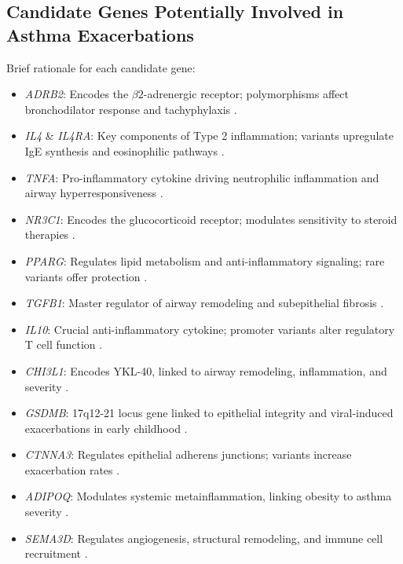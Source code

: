 \documentclass[11pt,a4paper]{article}
\begin{document}
\subsection{Candidate Genes Potentially Involved in Asthma Exacerbations}
Brief rationale for each candidate gene:
\begin{itemize}
    \item \textit{ADRB2}: Encodes the $\beta2$-adrenergic receptor; polymorphisms affect bronchodilator response and tachyphylaxis \cite{ZhaoZhang2019, KarimiVijverberg2021}.
    \item \textit{IL4} \& \textit{IL4RA}: Key components of Type 2 inflammation; variants upregulate IgE synthesis and eosinophilic pathways \cite{HameedAbood2024, ChoudharyLamichhane2024}.
    \item \textit{TNFA}: Pro-inflammatory cytokine driving neutrophilic inflammation and airway hyperresponsiveness \cite{AlAhmadAli2025, ZhuZhang2020}.
    \item \textit{NR3C1}: Encodes the glucocorticoid receptor; modulates sensitivity to steroid therapies \cite{PerezGarciaEspuelaOrtiz2023, PANEKJONAKOWSKI2016}.
    \item \textit{PPARG}: Regulates lipid metabolism and anti-inflammatory signaling; rare variants offer protection \cite{WangTantisira2016, LeungRyu2022}.
    \item \textit{TGFB1}: Master regulator of airway remodeling and subepithelial fibrosis \cite{PlichtaPanek2025, KowinJonakowski2024}.
    \item \textit{IL10}: Crucial anti-inflammatory cytokine; promoter variants alter regulatory T cell function \cite{WangTantisira2016, ImaniDashti2021}.
    \item \textit{CHI3L1}: Encodes YKL-40, linked to airway remodeling, inflammation, and severity \cite{ParkTantisira2017, KomiKazemi2016}.
    \item \textit{GSDMB}: 17q12-21 locus gene linked to epithelial integrity and viral-induced exacerbations in early childhood \cite{LiChristenson2021, SchoettlerDissanayake2022}.
    \item \textit{CTNNA3}: Regulates epithelial adherens junctions; variants increase exacerbation rates \cite{McGeachieWu2015}.
    \item \textit{ADIPOQ}: Modulates systemic metainflammation, linking obesity to asthma severity \cite{PetersDixon2018, GajewskaKuryowicz2016}.
    \item \textit{SEMA3D}: Regulates angiogenesis, structural remodeling, and immune cell recruitment \cite{McGeachieWu2015, RanjbarWhetstone2022}.
\end{itemize}
\end{document}

